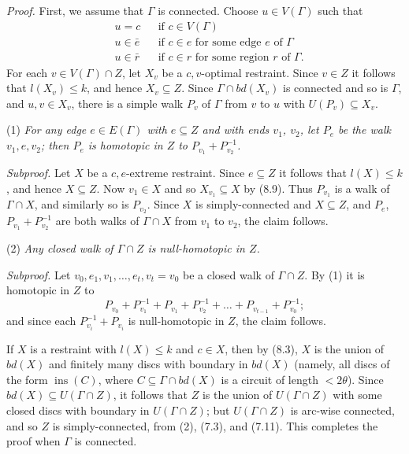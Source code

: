 \textit{Proof.} First, we assume that $\Gamma$ is connected. Choose $u \in V(\Gamma)$ such that
\begin{align*}
&u = c && \text{if } c \in V(\Gamma) \\
&u \in \bar{e} && \text{if } c \in e \text{ for some edge } e \text{ of } \Gamma \\
&u \in \bar{r} && \text{if } c \in r \text{ for some region } r \text{ of } \Gamma.
\end{align*}
For each $v \in V(\Gamma) \cap Z$, let $X_v$ be a $c, v$-optimal restraint. Since $v \in Z$ it follows that $l(X_v) \le k$, and hence $X_v \subseteq Z$. Since $\Gamma \cap bd(X_v)$ is connected and so is $\Gamma$, and $u, v \in X_v$, there is a simple walk $P_v$ of $\Gamma$ from $v$ to $u$ with $U(P_v) \subseteq X_v$.

\hspace*{12pt}(1) \textit{For any edge $e \in E(\Gamma)$ with $e \subseteq Z$ and with ends $v_1$, $v_2$, let $P_e$ be the walk $v_1, e, v_2$; then $P_e$ is homotopic in $Z$ to $P_{v_1} + P_{v_2}^{-1}$.}

\textit{Subproof.} Let $X$ be a $c, e$-extreme restraint. Since $e \subseteq Z$ it follows that $l(X) \le k$, and hence $X \subseteq Z$. Now $v_1 \in X$ and so $X_{v_1} \subseteq X$ by (8.9). Thus $P_{v_1}$ is a walk of $\Gamma \cap X$, and similarly so is $P_{v_2}$. Since $X$ is simply-connected and $X \subseteq Z$, and $P_e$, $P_{v_1} + P_{v_2}^{-1}$ are both walks of $\Gamma \cap X$ from $v_1$ to $v_2$, the claim follows.

\hspace*{12pt}(2) \textit{Any closed walk of $\Gamma \cap Z$ is null-homotopic in $Z$.}

\textit{Subproof.} Let $v_0, e_1, v_1, \dots, e_t, v_t = v_0$ be a closed walk of $\Gamma \cap Z$. By (1) it is homotopic in $Z$ to
\begin{equation*}
P_{v_0} + P_{v_1}^{-1} + P_{v_1} + P_{v_2}^{-1} + \dots + P_{v_{t-1}} + P_{v_0}^{-1};
\end{equation*}
and since each $P_{v_i}^{-1} + P_{v_i}$ is null-homotopic in $Z$, the claim follows.

If $X$ is a restraint with $l(X) \le k$ and $c \in X$, then by (8.3), $X$ is the union of $bd(X)$ and finitely many discs with boundary in $bd(X)$ (namely, all discs of the form $\operatorname{ins}(C)$, where $C \subseteq \Gamma \cap bd(X)$ is a circuit of length $< 2\theta$). Since $bd(X) \subseteq U(\Gamma \cap Z)$, it follows that $Z$ is the union of $U(\Gamma \cap Z)$ with some closed discs with boundary in $U(\Gamma \cap Z)$; but $U(\Gamma \cap Z)$ is arc-wise connected, and so $Z$ is simply-connected, from (2), (7.3), and (7.11). This completes the proof when $\Gamma$ is connected.

